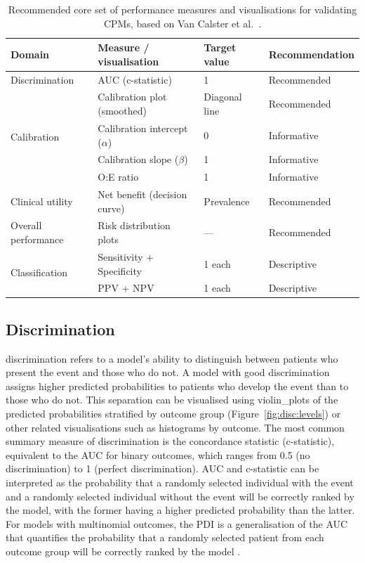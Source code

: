 \begin{table}[htbp]
\centering
\begin{threeparttable}
\caption[Recommended performance measures for validating prediction models]{Recommended core set of performance measures and visualisations for validating \glspl{CPM}, based on Van Calster et al.\ \cite{vancalsterPerformanceEvaluationPredictive2024}.}
\label{tab:intro:metrics}
\small
\begin{tabular}{llll}
\toprule
\textbf{Domain} & \textbf{Measure / visualisation} & \textbf{Target value} & \textbf{Recommendation} \\
\midrule
Discrimination
  & AUC (c-statistic) & 1 & Recommended \\
\midrule
\multirow{4}{*}{Calibration}
  & Calibration plot (smoothed) & Diagonal line & Recommended \\
  & Calibration intercept ($\alpha$) & 0 & Informative \\
  & Calibration slope ($\beta$) & 1 & Informative \\
  & O:E ratio & 1 & Informative \\
\midrule
Clinical utility
  & Net benefit (decision curve) & Prevalence & Recommended \\
  \midrule
Overall performance
  & Risk distribution plots & --- & Recommended \\
\midrule
\midrule
\multirow{2}{*}{Classification}
  & Sensitivity + Specificity & 1 each & Descriptive \\
  & PPV + NPV & 1 each & Descriptive \\
\bottomrule
\end{tabular}
\end{threeparttable}
\end{table}

\subsection{Discrimination}

\Gls{discrimination} refers to a model's ability to distinguish between patients who present the event and those who do not. A model with good discrimination assigns higher predicted probabilities to patients who develop the event than to those who do not. This separation can be visualised using \glspl{violin_plot} of the predicted probabilities stratified by outcome group (Figure~\ref{fig:disc:levels}) or other related visualisations such as histograms by outcome. The most common summary measure of \gls{discrimination} is the concordance statistic (c-statistic), equivalent to the \gls{AUC} for binary outcomes, which ranges from 0.5 (no discrimination) to 1 (perfect discrimination). \gls{AUC} and c-statistic can be interpreted as the probability that a randomly selected individual with the event and a randomly selected individual without the event will be correctly ranked by the model, with the former having a higher predicted probability than the latter. For models with multinomial outcomes, the \gls{PDI} is a generalisation of the \gls{AUC} that quantifies the probability that a randomly selected patient from each outcome group will be correctly ranked by the model \cite{van2012extending}.

